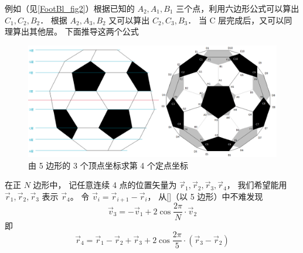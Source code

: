 例如（见\autoref{FootBl_fig2}）根据已知的 $A_2, A_1, B_1$ 三个点，利用六边形公式可以算出 $C_1, C_2, B_2$． 根据 $A_2, A_3, B_2$ 又可以算出 $C_2, C_3, B_3$． 当 C 层完成后，又可以同理算出其他层。 下面推导这两个公式

\begin{figure}[ht]
\centering
\includegraphics[width=14cm]{./figures/FootBl2.png}
\caption{由 5 边形的 3 个顶点坐标求第 4 个定点坐标} \label{FootBl_fig2}
\end{figure}

在正 $N$ 边形中， 记任意连续 4 点的位置矢量为 $\vec r_1, \vec r_2, \vec r_3, \vec r_4$， 我们希望能用 $\vec r_1, \vec r_2, \vec r_3$ 表示 $\vec r_4$。 令 $\vec v_i = \vec r_{i+1} - \vec r_i$， 从\autoref{}（以 5 边形）中不难发现
\begin{equation}
\vec v_3 = -\vec v_1 + 2\cos\frac{2\pi}{N} \cdot \vec v_2
\end{equation}
即
\begin{equation}
\vec r_4 = \vec r_1 - \vec r_2 + \vec r_3 + 2\cos\frac{2\pi}{5} \cdot (\vec r_3  - \vec r_2)
\end{equation}







